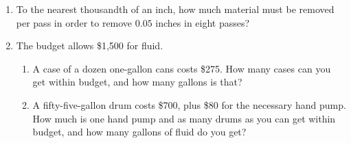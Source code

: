 \documentclass[12pt]{article}
\begin{document}
\begin{enumerate}
\item To the nearest thousandth of an inch, how much material must be removed per pass in order to remove $0.05$ inches in eight passes? 
\spacing

\item The budget allows \$1,500 for fluid. 
	\begin{enumerate}
		\item A case of a dozen one-gallon cans costs \$275. How many cases can you get within budget, and how many gallons is that?  
\spacing

		\item A fifty-five-gallon drum costs \$700, plus \$80 for the necessary hand pump. How much is one hand pump and as many drums as you can get within budget, and how many gallons of fluid do you get? 
	\end{enumerate}

\end{enumerate}
\end{document}
